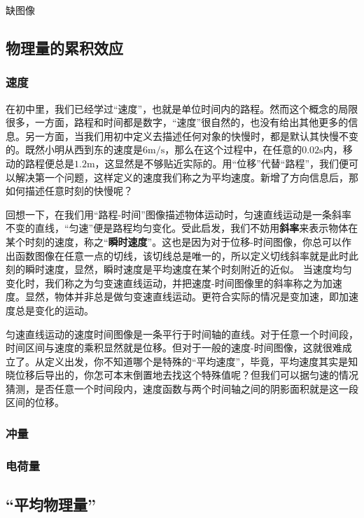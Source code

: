 
\begin{issues}
\issueTODO 缺图像
\end{issues}

\subsection{物理量的累积效应}

\subsubsection{速度}
在初中里，我们已经学过“速度”，也就是单位时间内的路程。然而这个概念的局限很多，一方面，路程和时间都是数字，“速度”很自然的，也没有给出其他更多的信息。另一方面，当我们用初中定义去描述任何对象的快慢时，都是默认其快慢不变的。既然小明从西到东的速度是$6 \mathrm{m/s}$，那么在这个过程中，在任意的$0.02\mathrm s$内，移动的路程便总是$1.2\mathrm m$，这显然是不够贴近实际的。用“位移”代替“路程”，我们便可以解决第一个问题，这样定义的速度我们称之为平均速度。新增了方向信息后，那如何描述任意时刻的快慢呢？

回想一下，在我们用“路程-时间”图像描述物体运动时，匀速直线运动是一条斜率不变的直线，“匀速”便是路程均匀变化。受此启发，我们不妨用\textbf{斜率}来表示物体在某个时刻的速度，称之“\textbf{瞬时速度}”。这也是因为对于位移-时间图像，你总可以作出函数图像在任意一点的切线，该切线总是唯一的，所以定义切线斜率就是此时此刻的瞬时速度，显然，瞬时速度是平均速度在某个时刻附近的近似。
当速度均匀变化时，我们称之为匀变速直线运动，并把速度-时间图像里的斜率称之为加速度。显然，物体并非总是做匀变速直线运动。更符合实际的情况是变加速，即加速度总是变化的运动。

匀速直线运动的速度时间图像是一条平行于时间轴的直线。对于任意一个时间段，时间区间与速度的乘积显然就是位移。但对于一般的速度-时间图像，这就很难成立了。从定义出发，你不知道哪个是特殊的“平均速度”，毕竟，平均速度其实是知晓位移后导出的，你怎可本末倒置地去找这个特殊值呢？但我们可以据匀速的情况猜测，是否任意一个时间段内，速度函数与两个时间轴之间的阴影面积就是这一段区间的位移。

\subsubsection{冲量}
\subsubsection{电荷量}
\subsection{“平均物理量”}
